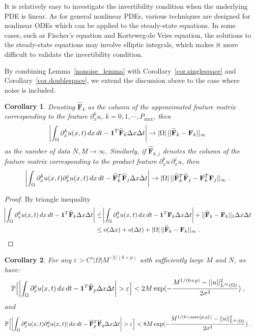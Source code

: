 \documentclass[a4paper,11pt]{article}
\newcommand{\bF}{\mathbf{F}}
\newtheorem{corollary}{Corollary}[section]
\theoremstyle{definition}
\begin{document}
It is relatively easy to investigate the invertibility condition when the underlying PDE is linear.  As for general nonlinear PDEs, various techniques are designed for nonlinear ODEs which can be applied to the steady-state equations. In some cases, such as Fischer's equation and Korteweg-de Vries equation, the solutions to the steady-state equations may involve elliptic integrals, which makes it more difficult to validate the invertibility condition.

By combining Lemma~\ref{nonoise_lemma} with Corollary~\ref{cor.singlespace} and Corollary~\ref{cor.doublespace}, we extend the discussion above to the case where noise is included.
\begin{corollary}
Denoting $\widehat{\bF}_k$ as the column of the approximated feature matrix corresponding to the feature $\partial_x^k u$, $k=0,1,\cdots,P_{\max}$, then
\begin{align*}
	\abs{\int_\Omega\partial_x^ku(x,t)\,dx\,dt-\mathbf{1}^T\widehat{\bF}_k\Delta x\Delta t}\to |\Omega|\,||\widehat{\bF}_k-\bF_k||_\infty
\end{align*}
as the number of data $N,M\to\infty$. Similarly, if $\widehat{\bF}_{k,j}$ denotes the column of the feature matrix corresponding to the product feature $\partial_x^ku\,\partial_x^ju$, then
\begin{align*}
	\abs{\int_\Omega\partial_x^ku(x,t)\partial_x^ju(x,t)\,dx\,dt-\widehat{\bF}_{k}^T\widehat{\bF}_{j}\Delta x\Delta t}\to |\Omega|\,||\widehat{\bF}^T_{k}\widehat{\bF}_{j}-\bF^T_{k}\bF_{j}||_\infty\;.
\end{align*}

\end{corollary}
\begin{proof} By triangle inequality
\begin{align*}
	\abs{\int_\Omega \partial_x^ku(x,t)\,dx\,dt-\mathbf{1}^T\widehat{\bF}_k\Delta x\Delta t}&\leq \abs{\int_\Omega\partial_x^ku(x,t)\,dx\,dt-\mathbf{1}^T\bF_k\Delta x\Delta t}+||\widehat{\bF}_k-\bF_k||_1\Delta x\Delta t\\
	&\leq o(\Delta x) + o(\Delta t)+|\Omega|\,||\widehat{\bF}_k-\bF_k||_\infty\;.
\end{align*}
\end{proof}
\begin{corollary}
For any $\varepsilon >C'|\Omega|M^{-2/(6+p)}$ with sufficiently large $M$ and $N$, we have:
\begin{align*}
\mathbb{P}\Big[\abs{\int_\Omega\partial_x^pu(x,t)\,dx\,dt-\mathbf{1}^T\widehat{\bF}_p\Delta x\Delta t}>\varepsilon\Big]<2M\exp(-\frac{M^{1/(6+p)}-||u||_{L^\infty(\Omega)}^2}{2\sigma^2})\;,
\end{align*}
and
\begin{align*}
\mathbb{P}\Big[\abs{\int_\Omega\partial_x^pu(x,t)\partial_x^qu(x,t)|\,dx\,dt-\widehat{\bF}^T_p\widehat{\bF}_q\Delta x\Delta t}>\varepsilon\Big]<8M\exp(-\frac{M^{1/(6+\max\{p,q\})}-||u||_{L^\infty(\Omega)}^2}{2\sigma^2})\;.
\end{align*}
\end{corollary}
\end{document}
